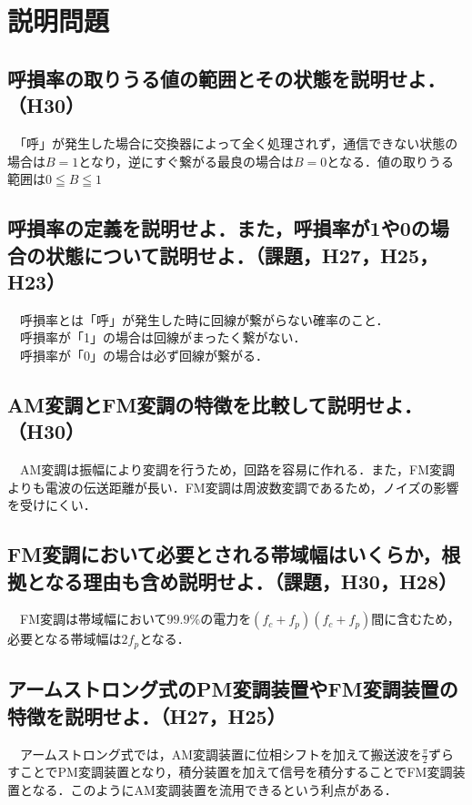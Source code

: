 

\pagestyle{fancy}
\section{説明問題}
\subsection{呼損率の取りうる値の範囲とその状態を説明せよ．（H30）}
　「呼」が発生した場合に交換器によって全く処理されず，通信できない状態の場合は$B=1$となり，逆にすぐ繋がる最良の場合は$B=0$となる．値の取りうる範囲は$0\leqq B \leqq1$\\

\subsection{呼損率の定義を説明せよ．また，呼損率が1や0の場合の状態について説明せよ．（課題，H27，H25，H23）}
　呼損率とは「呼」が発生した時に回線が繋がらない確率のこと．\\
　呼損率が「1」の場合は回線がまったく繋がない．\\
　呼損率が「0」の場合は必ず回線が繋がる．\\

\subsection{AM変調とFM変調の特徴を比較して説明せよ．（H30）}
　AM変調は振幅により変調を行うため，回路を容易に作れる．また，FM変調よりも電波の伝送距離が長い．FM変調は周波数変調であるため，ノイズの影響を受けにくい．\\

\subsection{FM変調において必要とされる帯域幅はいくらか，根拠となる理由も含め説明せよ．（課題，H30，H28）}
　FM変調は帯域幅において$99.9\%$の電力を$\left( f_c + f_p \right) \left( f_c + f_p \right)$間に含むため，必要となる帯域幅は$2 f_p$となる．\\

\subsection{アームストロング式のPM変調装置やFM変調装置の特徴を説明せよ．（H27，H25）}
　アームストロング式では，AM変調装置に位相シフトを加えて搬送波を$\frac{\pi}{2}$ずらすことでPM変調装置となり，積分装置を加えて信号を積分することでFM変調装置となる．このようにAM変調装置を流用できるという利点がある．\\

